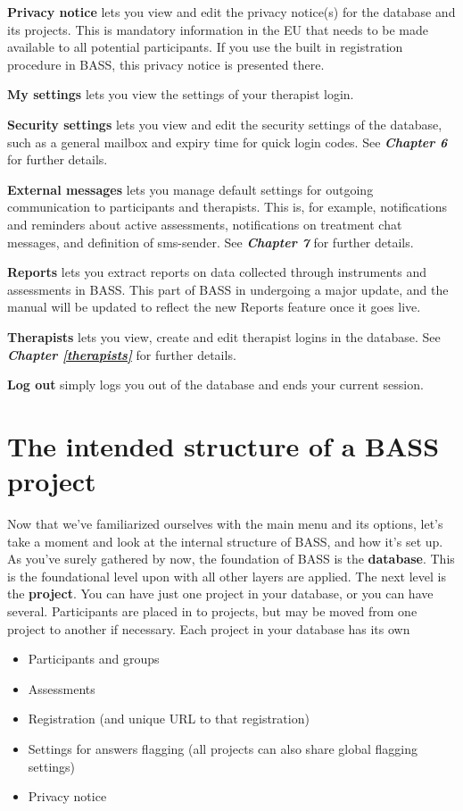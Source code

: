 \documentclass[
]{book}
\providecommand{\tightlist}{%
  \setlength{\itemsep}{0pt}\setlength{\parskip}{0pt}}
\begin{document}
\textbf{Privacy notice} lets you view and edit the privacy notice(s) for the database and its projects. This is mandatory information in the EU that needs to be made available to all potential participants. If you use the built in registration procedure in BASS, this privacy notice is presented there.

\textbf{My settings} lets you view the settings of your therapist login.

\textbf{Security settings} lets you view and edit the security settings of the database, such as a general mailbox and expiry time for quick login codes. See \textbf{\emph{Chapter 6}} for further details.

\textbf{External messages} lets you manage default settings for outgoing communication to participants and therapists. This is, for example, notifications and reminders about active assessments, notifications on treatment chat messages, and definition of sms-sender. See \textbf{\emph{Chapter 7}} for further details.

\textbf{Reports} lets you extract reports on data collected through instruments and assessments in BASS. This part of BASS in undergoing a major update, and the manual will be updated to reflect the new Reports feature once it goes live.

\textbf{Therapists} lets you view, create and edit therapist logins in the database. See \textbf{\emph{Chapter \ref{therapists}}} for further details.

\textbf{Log out} simply logs you out of the database and ends your current session.

\section{The intended structure of a BASS project}\label{the-intended-structure-of-a-bass-project}

Now that we've familiarized ourselves with the main menu and its options, let's take a moment and look at the internal structure of BASS, and how it's set up.
As you've surely gathered by now, the foundation of BASS is the \textbf{database}. This is the foundational level upon with all other layers are applied. The next level is the \textbf{project}. You can have just one project in your database, or you can have several. Participants are placed in to projects, but may be moved from one project to another if necessary. Each project in your database has its own

\begin{itemize}
\tightlist
\item
  Participants and groups
\item
  Assessments
\item
  Registration (and unique URL to that registration)
\item
  Settings for answers flagging (all projects can also share global flagging settings)
\item
  Privacy notice
\end{itemize}
\end{document}
